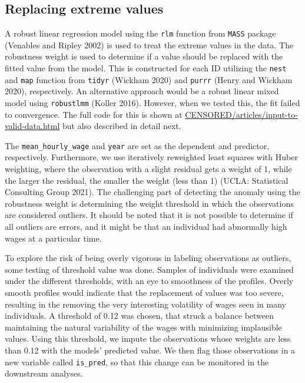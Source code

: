 \documentclass{article}
\begin{document}
\hypertarget{censor}{%
\subsection{Replacing extreme values}\label{censor}}

A robust linear regression model using the \texttt{rlm} function from \texttt{MASS} package (Venables and Ripley 2002) is used to treat the extreme values in the data. The robustness weight is used to determine if a value should be replaced with the fitted value from the model. This is constructed for each ID utilizing the \texttt{nest} and \texttt{map} function from \texttt{tidyr} (Wickham 2020) and \texttt{purrr} (Henry and Wickham 2020), respectively. An alternative approach would be a robust linear mixed model using \texttt{robustlmm} (Koller 2016). However, when we tested this, the fit failed to convergence. The full code for this is shown at \url{CENSORED/articles/input-to-valid-data.html} but also described in detail next.

The \texttt{mean\_hourly\_wage} and \texttt{year} are set as the dependent and predictor, respectively. Furthermore, we use iteratively reweighted least squares with Huber weighting, where the observation with a slight residual gets a weight of 1, while the larger the residual, the smaller the weight (less than 1) (UCLA: Statistical Consulting Group 2021). The challenging part of detecting the anomaly using the robustness weight is determining the weight threshold in which the observations are considered outliers. It should be noted that it is not possible to determine if all outliers are errors, and it might be that an individual had abnormally high wages at a particular time.

To explore the risk of being overly vigorous in labeling observations as outliers, some testing of threshold value was done. Samples of individuals were examined under the different thresholds, with an eye to smoothness of the profiles. Overly smooth profiles would indicate that the replacement of values was too severe, resulting in the removing the very interesting volatility of wages seen in many individuals. A threshold of 0.12 was chosen, that struck a balance between maintaining the natural variability of the wages with minimizing implausible values.
Using this threshold, we impute the observations whose weights are less than 0.12 with the models' predicted value. We then flag those observations in a new variable called \texttt{is\_pred}, so that this change can be monitored in the downstream analyses.
\end{document}

